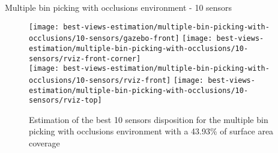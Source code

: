 \begin{frame}{Multiple bin picking with occlusions environment - 10 sensors}
	\begin{figure}
		\centering
		\texttt{[image: best-views-estimation/multiple-bin-picking-with-occlusions/10-sensors/gazebo-front]}\hspace{2em}
		\texttt{[image: best-views-estimation/multiple-bin-picking-with-occlusions/10-sensors/rviz-front-corner]}\\
		\texttt{[image: best-views-estimation/multiple-bin-picking-with-occlusions/10-sensors/rviz-front]}\hspace{1.5em}
		\texttt{[image: best-views-estimation/multiple-bin-picking-with-occlusions/10-sensors/rviz-top]}
		\caption{Estimation of the best 10 sensors disposition for the multiple bin picking with occlusions environment with a 43.93\% of surface area coverage}
	\end{figure}
\end{frame}
